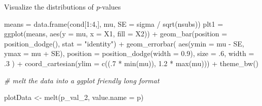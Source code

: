 \documentclass[
]{book}
\newenvironment{Shaded}{\begin{snugshade}}{\end{snugshade}}
\newcommand{\AttributeTok}[1]{\textcolor[rgb]{0.77,0.63,0.00}{#1}}
\newcommand{\CommentTok}[1]{\textcolor[rgb]{0.56,0.35,0.01}{\textit{#1}}}
\newcommand{\DecValTok}[1]{\textcolor[rgb]{0.00,0.00,0.81}{#1}}
\newcommand{\FloatTok}[1]{\textcolor[rgb]{0.00,0.00,0.81}{#1}}
\newcommand{\FunctionTok}[1]{\textcolor[rgb]{0.00,0.00,0.00}{#1}}
\newcommand{\NormalTok}[1]{#1}
\newcommand{\OtherTok}[1]{\textcolor[rgb]{0.56,0.35,0.01}{#1}}
\newcommand{\SpecialCharTok}[1]{\textcolor[rgb]{0.00,0.00,0.00}{#1}}
\newcommand{\StringTok}[1]{\textcolor[rgb]{0.31,0.60,0.02}{#1}}
\begin{document}
Visualize the distributions of \emph{p}-values

\begin{Shaded}
\begin{Highlighting}[]
\NormalTok{means }\OtherTok{=} \FunctionTok{data.frame}\NormalTok{(cond[}\DecValTok{1}\SpecialCharTok{:}\DecValTok{4}\NormalTok{,], mu, }\AttributeTok{SE =}\NormalTok{ sigma }\SpecialCharTok{/} \FunctionTok{sqrt}\NormalTok{(nsubs))}
\NormalTok{plt1 }\OtherTok{=} \FunctionTok{ggplot}\NormalTok{(means, }\FunctionTok{aes}\NormalTok{(}\AttributeTok{y =}\NormalTok{ mu, }\AttributeTok{x =}\NormalTok{ X1, }\AttributeTok{fill =}\NormalTok{ X2)) }\SpecialCharTok{+}
\FunctionTok{geom\_bar}\NormalTok{(}\AttributeTok{position =} \FunctionTok{position\_dodge}\NormalTok{(), }\AttributeTok{stat =} \StringTok{"identity"}\NormalTok{) }\SpecialCharTok{+}
\FunctionTok{geom\_errorbar}\NormalTok{(}
\FunctionTok{aes}\NormalTok{(}\AttributeTok{ymin =}\NormalTok{ mu }\SpecialCharTok{{-}}\NormalTok{ SE, }\AttributeTok{ymax =}\NormalTok{ mu }\SpecialCharTok{+}\NormalTok{ SE),}
\AttributeTok{position =} \FunctionTok{position\_dodge}\NormalTok{(}\AttributeTok{width =} \FloatTok{0.9}\NormalTok{),}
\AttributeTok{size =}\NormalTok{ .}\DecValTok{6}\NormalTok{,}
\AttributeTok{width =}\NormalTok{ .}\DecValTok{3}
\NormalTok{) }\SpecialCharTok{+}
\FunctionTok{coord\_cartesian}\NormalTok{(}\AttributeTok{ylim =} \FunctionTok{c}\NormalTok{((.}\DecValTok{7} \SpecialCharTok{*} \FunctionTok{min}\NormalTok{(mu)), }\FloatTok{1.2} \SpecialCharTok{*} \FunctionTok{max}\NormalTok{(mu))) }\SpecialCharTok{+}
\FunctionTok{theme\_bw}\NormalTok{()}
 
\CommentTok{\# melt the data into a ggplot friendly \textquotesingle{}long\textquotesingle{} format}

\NormalTok{plotData }\OtherTok{\textless{}{-}} \FunctionTok{melt}\NormalTok{(p\_val\_2, }\AttributeTok{value.name =} \StringTok{\textquotesingle{}p\textquotesingle{}}\NormalTok{)}
 

\end{Highlighting}
\end{Shaded}
\end{document}
